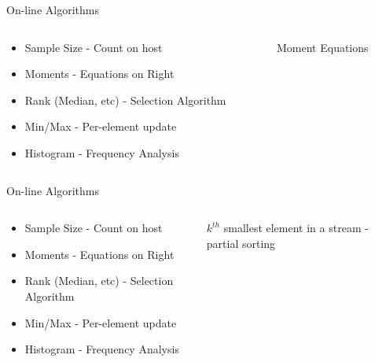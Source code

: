 \documentclass[10pt,aspectratio=169]{beamer} %
\newcommand{\hide}[1] {
	\textcolor{hiddencolor}{#1}
}
\begin{document}
\begin{frame}{On-line Algorithms}
\begin{columns}[c]
\begin{column}{0.5\textwidth}
\begin{itemize}
\item \hide{Sample Size - Count on host}
\item \alert{Moments - Equations on Right}
\item \hide{Rank (Median, etc) - Selection Algorithm}
\item \hide{Min/Max - Per-element update}
\item \hide{Histogram - Frequency Analysis}
\end{itemize}
\end{column}
\begin{column}{0.5\textwidth}
\begin{figure}
	{
	\setlength{\fboxsep}{1pt}%
	\setlength{\fboxrule}{1pt}%
	}%
    \caption{Moment Equations \cite{Pebay2008}}
\end{figure}
\end{column}
\end{columns}
\end{frame}

\begin{frame}{On-line Algorithms}
\begin{columns}[c]
\begin{column}{0.5\textwidth}
\begin{itemize}
\item \hide{Sample Size - Count on host}
\item \hide{Moments - Equations on Right}
\item \alert{Rank (Median, etc) - Selection Algorithm}
\item \hide{Min/Max - Per-element update}
\item \hide{Histogram - Frequency Analysis}
\end{itemize}
\end{column}
\begin{column}{0.5\textwidth}
$k^{th}$ smallest element in a stream - partial sorting
\end{column}
\end{columns}
\end{frame}
\end{document}
